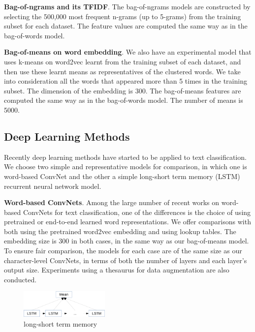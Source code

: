 \documentclass{article} %
\begin{document}
\textbf{Bag-of-ngrams and its TFIDF}. The bag-of-ngrams models are constructed by selecting the 500,000 most frequent n-grams (up to 5-grams) from the training subset for each dataset. The feature values are computed the same way as in the bag-of-words model.

\textbf{Bag-of-means on word embedding}. We also have an experimental model that uses k-means on word2vec\cite{MSCCD13} learnt from the training subset of each dataset, and then use these learnt means as representatives of the clustered words. We take into consideration all the words that appeared more than 5 times in the training subset. The dimension of the embedding is 300. The bag-of-means features are computed the same way as in the bag-of-words model. The number of means is 5000.

\subsection{Deep Learning Methods}

Recently deep learning methods have started to be applied to text classification. We choose two simple and representative models for comparison, in which one is word-based ConvNet and the other a simple long-short term memory (LSTM)\cite{HS97} recurrent neural network model.

\textbf{Word-based ConvNets}. Among the large number of recent works on word-based ConvNets for text classification, one of the differences is the choice of using pretrained or end-to-end learned word representations. We offer comparisons with both using the pretrained word2vec\cite{MSCCD13} embedding\cite{K14} and using lookup tables\cite{CWB11}. The embedding size is 300 in both cases, in the same way as our bag-of-means model. To ensure fair comparison, the models for each case are of the same size as our character-level ConvNets, in terms of both the number of layers and each layer's output size. Experiments using a thesaurus for data augmentation are also conducted.

\begin{figure}
  \begin{center}
    \includegraphics[width=0.39\textwidth]{lstm}
  \end{center}
  \caption{long-short term memory}
  \label{fig:lstm}
\end{figure}
\end{document}
